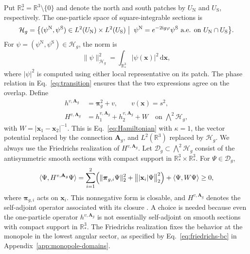 \documentclass[11pt,a4paper]{article}
\theoremstyle{remark}
\theoremstyle{plain}
\newcommand{\R}{\mathbb R}
\newcommand{\A}{\mathbf A}
\newcommand{\bpi}{\boldsymbol\pi}
\newcommand{\cH}{\mathcal H}
\newcommand{\ip}[2]{\langle #1,#2\rangle}
\begin{document}
Put $\R^3_*=\R^3\setminus\{0\}$ and denote the north and south patches
by $U_{\mathrm N}$ and $U_{\mathrm S}$, respectively. The one-particle
space of square-integrable sections is
\begin{equation*}
 \cH_g=\bigl\{
 (\psi^{\mathrm N},\psi^{\mathrm S})
 \in L^2(U_{\mathrm N})\times L^2(U_{\mathrm S})
 \bigm|\;
 \psi^{\mathrm N}=e^{-2\mathrm{i}g\varphi}\psi^{\mathrm S}
 \text{ a.e. on }U_{\mathrm N}\cap U_{\mathrm S}
 \bigr\}.
\end{equation*}
For $\psi=(\psi^{\mathrm N},\psi^{\mathrm S})\in\cH_g$, the norm is
\begin{equation*}
 \|\psi\|_{\cH_g}^2
 =\int_{\R^3_*}|\psi(\mathbf x)|^2\,\mathrm{d}\mathbf x,
\end{equation*}
where $|\psi|^2$ is computed using either local representative on its
patch. The phase relation in Eq.~\eqref{eq:transition} ensures that
the two expressions agree on the overlap. Define
\begin{equation}
 \begin{aligned}
 h^{v,\A_g}&=\bpi_g^2+v,\qquad v(\mathbf x)=s^2,\\
 H^{v,\A_g}&=h^{v,\A_g}_1+h^{v,\A_g}_2+W
       \quad\text{on }\bigwedge\nolimits^2\cH_g,
 \end{aligned}
 \label{eq:monopole-H}
\end{equation}
with $W=|\mathbf x_1-\mathbf x_2|^{-1}$. This is
Eq.~\eqref{eq:Hamiltonian} with $\kappa=1$, the vector potential
replaced by the connection $\A_g$, and $L^2(\R^3)$ replaced by $\cH_g$.
We always use the Friedrichs realization of $H^{v,\A_g}$. Let
$\mathcal D_g\subset\bigwedge^2\cH_g$ consist of the antisymmetric
smooth sections with compact support in $\R^3_*\times\R^3_*$. For
$\Psi\in\mathcal D_g$,
\begin{equation}
 \ip{\Psi}{H^{v,\A_g}\Psi}
   =\sum_{i=1}^2\Bigl(\|\bpi_{g,i}\Psi\|_2^2
   +\bigl\||\mathbf x_i|\Psi\bigr\|_2^2\Bigr)
   +\ip{\Psi}{W\Psi}\ge0,
 \label{eq:monopole-form}
\end{equation}
where $\bpi_{g,i}$ acts on $\mathbf x_i$. This nonnegative form is
closable, and $H^{v,\A_g}$ denotes the self-adjoint operator associated
with its closure \cite[Theorem~X.23]{RS2}. A choice is needed because even
the one-particle operator $h^{v,\A_g}$ is not essentially self-adjoint
on smooth sections with compact support in $\R^3_*$. The Friedrichs
realization fixes the behavior at the monopole in the lowest angular
sector, as specified by Eq.~\eqref{eq:friedrichs-bc} in
Appendix~\ref{app:monopole-domains}.
\end{document}
